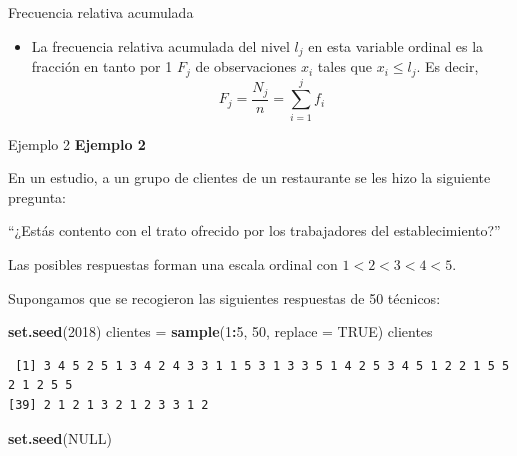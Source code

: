 \documentclass[
  ignorenonframetext,
]{beamer}
\newenvironment{Shaded}{\begin{snugshade}}{\end{snugshade}}
\newcommand{\AttributeTok}[1]{\textcolor[rgb]{0.13,0.29,0.53}{#1}}
\newcommand{\ConstantTok}[1]{\textcolor[rgb]{0.56,0.35,0.01}{#1}}
\newcommand{\DecValTok}[1]{\textcolor[rgb]{0.00,0.00,0.81}{#1}}
\newcommand{\FunctionTok}[1]{\textcolor[rgb]{0.13,0.29,0.53}{\textbf{#1}}}
\newcommand{\NormalTok}[1]{#1}
\newcommand{\OtherTok}[1]{\textcolor[rgb]{0.56,0.35,0.01}{#1}}
\newcommand{\SpecialCharTok}[1]{\textcolor[rgb]{0.81,0.36,0.00}{\textbf{#1}}}
\providecommand{\tightlist}{%
  \setlength{\itemsep}{0pt}\setlength{\parskip}{0pt}}
\begin{document}
\begin{frame}{Frecuencia relativa acumulada}
\label{frecuencia-relativa-acumulada-6}
\begin{itemize}
\tightlist
\item
  La frecuencia relativa acumulada del nivel \(l_j\) en esta variable
  ordinal es la fracción en tanto por 1 \(F_j\) de observaciones \(x_i\)
  tales que \(x_i\le l_j\). Es decir,
  \[F_j=\frac{N_j}{n}=\sum_{i=1}^jf_i\]
\end{itemize}
\end{frame}

\begin{frame}[fragile]{Ejemplo 2}
\label{ejemplo-2-2}
\textbf{Ejemplo 2}

En un estudio, a un grupo de clientes de un restaurante se les hizo la
siguiente pregunta:

``¿Estás contento con el trato ofrecido por los trabajadores del
establecimiento?''

Las posibles respuestas forman una escala ordinal con \(1<2<3<4<5\).

Supongamos que se recogieron las siguientes respuestas de 50 técnicos:

\begin{Shaded}
\begin{Highlighting}[]
\FunctionTok{set.seed}\NormalTok{(}\DecValTok{2018}\NormalTok{)}
\NormalTok{clientes }\OtherTok{=} \FunctionTok{sample}\NormalTok{(}\DecValTok{1}\SpecialCharTok{:}\DecValTok{5}\NormalTok{, }\DecValTok{50}\NormalTok{, }\AttributeTok{replace =} \ConstantTok{TRUE}\NormalTok{)}
\NormalTok{clientes}
\end{Highlighting}
\end{Shaded}

\begin{verbatim}
 [1] 3 4 5 2 5 1 3 4 2 4 3 3 1 1 5 3 1 3 3 5 1 4 2 5 3 4 5 1 2 2 1 5 5 2 1 2 5 5
[39] 2 1 2 1 3 2 1 2 3 3 1 2
\end{verbatim}

\begin{Shaded}
\begin{Highlighting}[]
\FunctionTok{set.seed}\NormalTok{(}\ConstantTok{NULL}\NormalTok{)}
\end{Highlighting}
\end{Shaded}
\end{frame}
\end{document}
